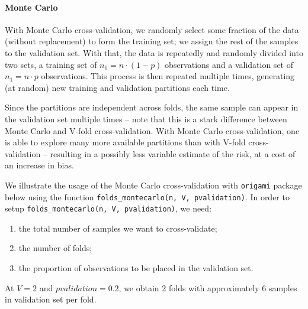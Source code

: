 \documentclass[12pt, krantz2,]{krantz}
\providecommand{\tightlist}{%
  \setlength{\itemsep}{0pt}\setlength{\parskip}{0pt}}
\let\oldparagraph\paragraph
\renewcommand{\paragraph}[1]{\oldparagraph{#1}\mbox{}}
\theoremstyle{definition}
\theoremstyle{definition}
\theoremstyle{definition}
\newcommand{\1}{\mathbbm{1}}
\begin{document}
\hypertarget{monte-carlo}{%
\paragraph{Monte Carlo}\label{monte-carlo}}

With Monte Carlo cross-validation, we randomly select some fraction of the data
(without replacement) to form the training set; we assign the rest of the
samples to the validation set. With that, the data is repeatedly and randomly
divided into two sets, a training set of \(n_0 = n \cdot (1-p)\) observations and
a validation set of \(n_1 = n \cdot p\) observations. This process is then
repeated multiple times, generating (at random) new training and validation
partitions each time.

Since the partitions are independent across folds, the same sample can appear in
the validation set multiple times -- note that this is a stark difference
between Monte Carlo and V-fold cross-validation. With Monte Carlo
cross-validation, one is able to explore many more available partitions than
with V-fold cross-validation -- resulting in a possibly less variable estimate
of the risk, at a cost of an increase in bias.

We illustrate the usage of the Monte Carlo cross-validation with \texttt{origami}
package below using the function \texttt{folds\_montecarlo(n,\ V,\ pvalidation)}. In order
to setup \texttt{folds\_montecarlo(n,\ V,\ pvalidation)}, we need:

\begin{enumerate}
\def\labelenumi{\arabic{enumi}.}
\tightlist
\item
  the total number of samples we want to cross-validate;
\item
  the number of folds;
\item
  the proportion of observations to be placed in the validation set.
\end{enumerate}

At \(V=2\) and \(pvalidation=0.2\), we obtain 2 folds with approximately \(6\) samples
in validation set per fold.
\end{document}
